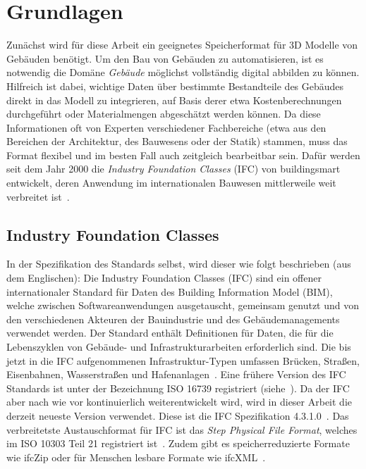 \chapter{Grundlagen}\label{basics}
Zunächst wird für diese Arbeit ein geeignetes Speicherformat für 3D Modelle von Gebäuden benötigt.
Um den Bau von Gebäuden zu automatisieren, ist es notwendig die Domäne \textit{Gebäude} möglichst vollständig digital abbilden zu können. 
Hilfreich ist dabei, wichtige Daten über bestimmte Bestandteile des Gebäudes direkt in das Modell zu integrieren, auf Basis derer etwa Kostenberechnungen durchgeführt oder Materialmengen abgeschätzt werden können.
Da diese Informationen oft von Experten verschiedener Fachbereiche (etwa aus den Bereichen der Architektur, des Bauwesens oder der Statik) stammen, muss das Format flexibel und im besten Fall auch zeitgleich bearbeitbar sein.
Dafür werden seit dem Jahr 2000 die \textit{Industry Foundation Classes} (IFC) von buildingsmart entwickelt, deren Anwendung im internationalen Bauwesen mittlerweile weit verbreitet ist~\cite{Industry61:online}.


\section{Industry Foundation Classes}\label{basics:ifc}
In der Spezifikation des Standards selbst, wird dieser wie folgt beschrieben (aus dem Englischen):
\glqq{}Die Industry Foundation Classes (IFC) sind ein offener internationaler Standard für Daten des Building Information Model (BIM), welche zwischen Softwareanwendungen ausgetauscht, gemeinsam genutzt und von den verschiedenen Akteuren der Bauindustrie und des Gebäudemanagements verwendet werden. 
Der Standard enthält Definitionen für Daten, die für die Lebenszyklen von Gebäude- und Infrastrukturarbeiten erforderlich sind. 
Die bis jetzt in die IFC aufgenommenen Infrastruktur-Typen umfassen Brücken, Straßen, Eisenbahnen, Wasserstraßen und Hafenanlagen\grqq{}~\cite{IFCScope:online}. 
Eine frühere Version des IFC Standards ist unter der Bezeichnung ISO 16739 registriert (siehe~\cite{ISOISO1694:online}).
Da der IFC aber nach wie vor kontinuierlich weiterentwickelt wird, wird in dieser Arbeit die derzeit neueste Version verwendet.
Diese ist die IFC Spezifikation 4.3.1.0~\cite{IFC4310Spezification:online}.
Das verbreitetste Austauschformat für IFC ist das \textit{Step Physical File Format}, welches im ISO 10303 Teil 21 registriert ist~\cite{ISO_Step:online}.
Zudem gibt es speicherreduzierte Formate wie ifcZip oder für Menschen lesbare Formate wie ifcXML~\cite{Industry93:online}\cite{IFCForma28:online}\cite{BIM_handbook_AEC_XML_SCHEMAS}.

